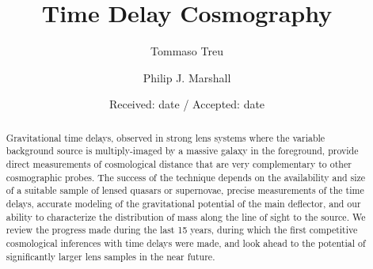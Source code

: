 \documentclass[smallextended]{svjour3}       %
\begin{document}
\title{Time Delay Cosmography%
}


\author{Tommaso Treu         \and
        Philip J. Marshall %
}



\date{Received: date / Accepted: date}

\maketitle


\begin{abstract}

Gravitational time delays, observed in strong lens systems where the
variable background source is multiply-imaged by a massive galaxy in
the foreground, provide direct measurements of cosmological distance
that are very complementary to other cosmographic probes. The success
of the technique depends on the availability and size of a suitable
sample of lensed quasars or supernovae, precise measurements of the
time delays, accurate modeling of the gravitational potential of the
main deflector, and our ability to characterize the distribution of
mass along the line of sight to the source. We review the progress
made during the last 15 years, during which the first competitive
cosmological inferences with time delays were made, and look ahead to
the potential of significantly larger lens samples in the near future.

\end{abstract}
\end{document}
